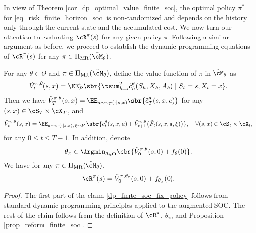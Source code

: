 \documentclass[9pt]{article}
\numberwithin{equation}{section}
\begin{document}
In view of Theorem \ref{cor_dp_optimal_value_finite_soc}, the optimal policy $\pi^*$ for \eqref{eq_risk_finite_horizon_soc} is non-randomized and depends on the history only through the current state and the accumulated cost.
We now turn our attention to evaluating $\cR^\pi(s)$ for any given policy $\pi$.
Following a similar argument as before, we proceed to establish the dynamic programming equations of $\cR^\pi(s)$ for any $\pi \in \Pi_{\mathrm{MR}}(\tilde{\cM}_\theta)$.

\begin{theorem}\label{thrm_eval_soc_dp_finite}
    For any $\theta \in \Theta$ and $\pi \in \Pi_{\mathrm{MR}}(\tilde{\cM}_\theta)$, define the value function of $\pi$ in $\tilde{\cM}_\theta$ as
    \begin{align*}
        \tilde{V}_t^{\pi,\theta}(s,x)
        =
        \EE^\pi_P
        \sbr{
        \tsum_{h=t}^T \tilde{c}_h^\theta(S_h,X_h,A_h)
        \mid S_t=s, X_t=x
        }.
    \end{align*}
    Then we have
    $\tilde{V}^{\pi,\theta}_T(s,x)
    =
    \EE_{a \sim \pi_T(\cdot|s,x)}
    \sbr{\tilde{c}_T^\theta(s,x,a)}$
    for any $(s,x)\in \cS_T \times \cX_T$, and
    \begin{align}\label{dp_finite_soc_fix_policy}
        \tilde{V}^{\pi,\theta}_t(s,x)
        =
        \EE_{a \sim \pi_t(\cdot|s,x),\, \xi \sim P_t}
        \sbr{
        \tilde{c}_t^\theta(s,x,a)
        +
        \tilde{V}_{t+1}^{\pi,\theta}\bigl(\tilde{F}_t(s,x,a,\xi)\bigr)
        },
        \quad \forall (s,x)\in \cS_t \times \cX_t,
    \end{align}
    for any $0 \leq t \leq T-1$.
    In addition, denote
    \begin{align*}
        \theta_\pi
        \in
        \Argmin_{\theta \in \Theta}
        \cbr{
        \tilde{V}^{\pi,\theta}_0(s,0) + f_\theta(0)
        }.
    \end{align*}
    We have for any $\pi \in \Pi_{\mathrm{MR}}(\tilde{\cM}_\theta)$,
    \begin{align}
        \cR^\pi(s)
        =
        \tilde{V}^{\pi,\theta_\pi}_0(s,0) + f_{\theta_\pi}(0). \label{fin_soc_pol_eval_val_to_risk}
    \end{align}
\end{theorem}

\begin{proof}
    The first part of the claim \eqref{dp_finite_soc_fix_policy} follows from standard dynamic programming principles applied to the augmented SOC. 
    The rest of the claim follows from the definition of $\cR^\pi$, $\theta_\pi$, and Proposition \ref{prop_reform_finite_soc}.
\end{proof}
\end{document}
